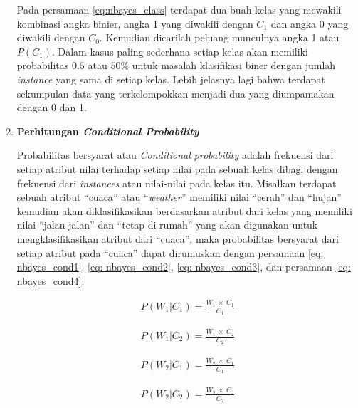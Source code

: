 \begin{enumerate}[label=\textbf{\arabic*).}]
	Pada persamaan \ref{eq:nbayes_class} terdapat dua buah kelas yang mewakili kombinasi angka binier, angka 1 yang diwakili dengan $C_{1}$ dan angka 0 yang diwakili dengan $C_{0}$. Kemudian dicarilah peluang munculnya angka 1 atau $P(C_{1})$. Dalam kasus paling sederhana setiap kelas akan memiliki probabilitas $0.5$ atau $50\%$ untuk masalah klasifikasi biner dengan jumlah \textit{instance} yang sama di setiap kelas. Lebih jelasnya lagi bahwa terdapat sekumpulan data yang terkelompokkan menjadi dua yang diumpamakan dengan 0 dan 1.
	\vspace{1ex}

	\item \textbf{Perhitungan \textit{Conditional Probability}}

	Probabilitas bersyarat atau \textit{Conditional probability} adalah frekuensi dari setiap atribut nilai terhadap setiap nilai pada sebuah kelas dibagi dengan frekuensi dari \textit{instances} atau nilai-nilai pada kelas itu. Misalkan terdapat sebuah atribut ``cuaca'' atau ``\textit{weather}'' memiliki nilai ``cerah'' dan ``hujan'' kemudian akan diklasifikasikan berdasarkan atribut dari kelas yang memiliki nilai ``jalan-jalan'' dan ``tetap di rumah'' yang akan digunakan untuk mengklasifikasikan atribut dari ``cuaca'', maka probabilitas bersyarat dari setiap atribut pada ``cuaca'' dapat dirumuskan dengan persamaan \ref{eq: nbayes_cond1}, \ref{eq: nbayes_cond2}, \ref{eq: nbayes_cond3}, dan persamaan \ref{eq: nbayes_cond4}.

	\begin{equation}\label{eq: nbayes_cond1}
	\begin{split}
	P(W_{1}|C_{1}) = \frac{W_{1}\ \times\ C_{1}}{C_{1}}
	\end{split}
	\end{equation}
	
	\begin{equation}\label{eq: nbayes_cond2}
	\begin{split}
	P(W_{1}|C_{2}) = \frac{W_{1}\ \times\ C_{2}}{C_{2}}
	\end{split}
	\end{equation}
	
	\begin{equation}\label{eq: nbayes_cond3}
	\begin{split}
	P(W_{2}|C_{1}) = \frac{W_{2}\ \times\ C_{1}}{C_{1}}
	\end{split}
	\end{equation}
	
	\begin{equation}\label{eq: nbayes_cond4}
	\begin{split}
	P(W_{2}|C_{2}) = \frac{W_{2}\ \times\ C_{2}}{C_{2}}
	\end{split}
	\end{equation}


\end{enumerate}
